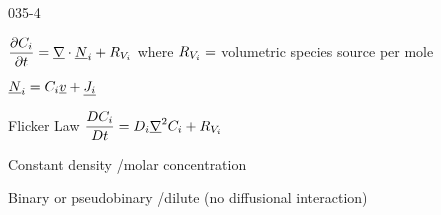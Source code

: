 \begin{mitframe}{035-4}
\begin{listone}
\item$\dfrac{\partial\conc_{\state}}{\partial{t}}=\gradop\cdot\uline\nummoles_{\state}+\gasconst_{\vol_{\state}}$ where $\gasconst_{\vol_{\state}}=$ volumetric species source per mole

\item$\uline{\nummoles}_{\state}=\conc_{\state}\uline{\vvel}+\uline{\molspecflux}$
			\begin{listtwo}
            \item Flicker Law $\dfrac{\elecdisplace\conc_{\state}}{\elecdisplace{t}}=\elecdisplace_{\state}\gradop^2\conc_{\state}+\gasconst_{\vol_{\state}}$
            			\begin{listthree}
                        \item Constant density /molar concentration
                        \item Binary or pseudobinary /dilute (no diffusional interaction)

						\end{listthree}

			\end{listtwo}
\end{listone}
\end{mitframe}